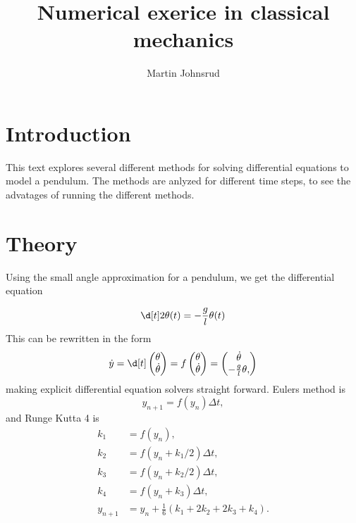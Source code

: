 \documentclass{article}
\title{Numerical exerice in classical mechanics}
\author{Martin Johnsrud}
\begin{document}
    \maketitle

    \section*{Introduction}
    This text explores several different methods for solving differential equations to model a pendulum. The methods are anlyzed for different time steps, to see the advatages of running the different methods.
    
    \section*{Theory}
    Using the small angle approximation for a pendulum, we get the differential equation
    
    \begin{equation*}
        \d[t]2 \theta(t) = -\frac{g}{l} \theta(t)
    \end{equation*}
    This can be rewritten in the form
        \begin{equation*}
            \dot y = \d[t]
            \begin{pmatrix}
                \theta \\
                \dot \theta
            \end{pmatrix}
            = f 
            \begin{pmatrix}
                \theta \\
                \dot \theta
            \end{pmatrix}
             =
            \begin{pmatrix}
                \dot \theta \\
                -\frac{g}{l} \theta,
            \end{pmatrix} 
        \end{equation*}  
    making explicit differential equation solvers straight forward. Eulers method is
    \begin{equation*}
        y_{n + 1} = f(y_n) \Delta t,
    \end{equation*}
    and Runge Kutta 4 is
    \begin{align*}
        k_1 &= f(y_n) ,\\
        k_2 &= f(y_n + k_1 / 2)\Delta t, \\
        k_3 &= f(y_n + k_2 / 2)\Delta t, \\
        k_4 &= f(y_n + k_3)\Delta t, \\
        y_{n + 1} &= y_n + \frac{1}{6}(k_1 + 2k_2 + 2k_3 + k_4).
    \end{align*}
\end{document}
